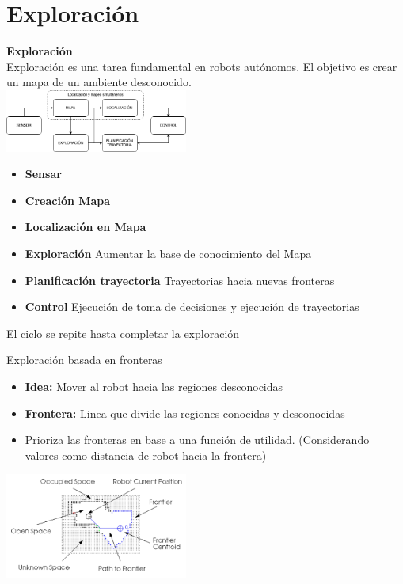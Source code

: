 \documentclass[
  24pt, %
  aspectratio=169, %
]{beamer}
\begin{document}
\section{Exploración}

\begin{frame}
  \textbf{Exploración}\\
  \bigskip %
  Exploración es una tarea fundamental en robots autónomos. El objetivo es crear un mapa de un ambiente desconocido.\\
  \bigskip %
  \centering
  \includegraphics[width=6cm]{exploracion}\\
  
  \begin{itemize}
  \item \textbf{Sensar} 
  \item \textbf{Creación Mapa} 
  \item \textbf{Localización en Mapa}
  \item \textbf{Exploración} Aumentar la base de conocimiento del Mapa
  \item \textbf{Planificación trayectoria} Trayectorias hacia nuevas fronteras 
  \item \textbf{Control} Ejecución de toma de decisiones y ejecución de trayectorias 
  \end{itemize}

  \pause \alert{El ciclo se repite hasta completar la exploración}
  
\end{frame}

\begin{frame}{Exploración basada en fronteras}

  \begin{itemize}
  \item \textbf{Idea:} Mover al robot hacia las regiones desconocidas
  \item \textbf{Frontera:} Linea que divide las regiones conocidas y desconocidas
  \item Prioriza las fronteras en base a una función de utilidad. (Considerando valores como distancia de robot hacia la frontera)
  \end{itemize}

  \bigskip %
  \centering
  \includegraphics[width=6cm]{fronteras} \\
  \cite{613851}
  
\end{frame}
\end{document}
